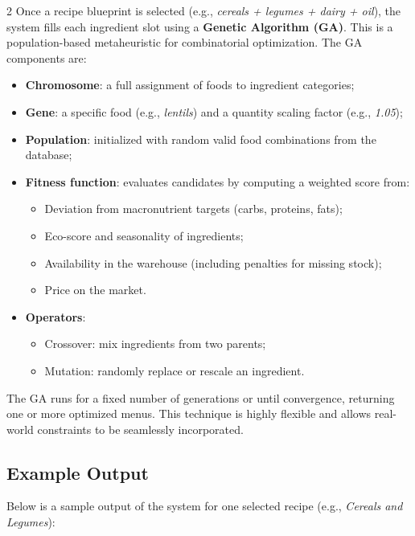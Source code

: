 \documentclass[10pt,a4paper]{article}
\begin{document}
\begin{multicols}{2}
Once a recipe blueprint is selected (e.g., \emph{cereals + legumes + dairy + oil}), the system fills each ingredient slot using a \textbf{Genetic Algorithm (GA)}. This is a population-based metaheuristic for combinatorial optimization. The GA components are:
\begin{itemize}[leftmargin=*]
  \item \textbf{Chromosome}: a full assignment of foods to ingredient categories;
  \item \textbf{Gene}: a specific food (e.g., \emph{lentils}) and a quantity scaling factor (e.g., \emph{1.05});
  \item \textbf{Population}: initialized with random valid food combinations from the database;
  \item \textbf{Fitness function}: evaluates candidates by computing a weighted score from:
    \begin{itemize}[leftmargin=*]
      \item Deviation from macronutrient targets (carbs, proteins, fats);
      \item Eco-score and seasonality of ingredients;
      \item Availability in the warehouse (including penalties for missing stock);
      \item Price on the market.
    \end{itemize}
  \item \textbf{Operators}:
    \begin{itemize}[leftmargin=*]
      \item Crossover: mix ingredients from two parents;
      \item Mutation: randomly replace or rescale an ingredient.
    \end{itemize}
\end{itemize}

The GA runs for a fixed number of generations or until convergence, returning one or more optimized menus. This technique is highly flexible and allows real-world constraints to be seamlessly incorporated.

\subsection{Example Output}

Below is a sample output of the system for one selected recipe (e.g., \textit{Cereals and Legumes}):


\end{multicols}
\end{document}
